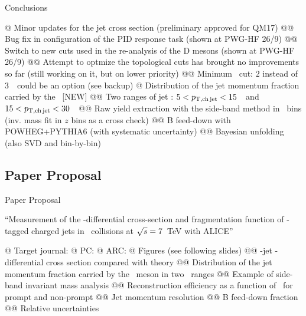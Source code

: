 \documentclass[xcolor={usenames,dvipsnames}, aspectratio=169]{beamer}
\begin{document}
\begin{frame}[fragile]{Conclusions}
\footnotesize
\begin{easylist}[itemize]
@ Minor updates for the jet cross section (preliminary approved for QM17)
@@ Bug fix in configuration of the PID response task (shown at PWG-HF 26/9)
@@ Switch to new cuts used in the re-analysis of the D mesons (shown at PWG-HF 26/9)
@@ Attempt to optmize the topological cuts has brought no improvements so far (still working on it, but on lower priority)
@@ Minimum \ptd\ cut: $2$ instead of $3$~\GeVc\ could be an option (see backup)
@ Distribution of the jet momentum fraction carried by the \Dzero\ \alert{[NEW]}
@@ Two ranges of jet \pt: $5<p_{\mathrm{T,ch\, jet}}<15$~\GeVc\ and $15<p_{\mathrm{T,ch\, jet}}<30$~\GeVc\
@@ Raw yield extraction with the side-band method in \ptd\ bins (inv. mass fit in $z$ bins as a cross check)
@@ B feed-down with POWHEG+PYTHIA6 (with systematic uncertainty)
@@ Bayesian unfolding (also SVD and bin-by-bin)
\end{easylist}
\end{frame}

\subsection{Paper Proposal}

\begin{frame}[fragile]{Paper Proposal}
\begin{center}
``Measurement of the \pt-differential cross-section and fragmentation function of \Dzero-tagged charged jets in \pp\ collisions at $\sqrt{s}=7$~TeV with ALICE''
\end{center}
\scriptsize
\begin{easylist}[itemize]
@ Target journal:
@ PC:
@ ARC:
@ Figures (see following slides)
@@ \Dzero-jet \pt-differential cross section compared with theory
@@ Distribution of the jet momentum fraction carried by the \Dzero\ meson in two \ptchjet\ ranges
@@ Example of side-band invariant mass analysis
@@ Reconstruction efficiency as a function of \ptd\ for prompt and non-prompt
@@ Jet momentum resolution
@@ B feed-down fraction
@@ Relative uncertainties
\end{easylist}
\end{frame}
\end{document}
